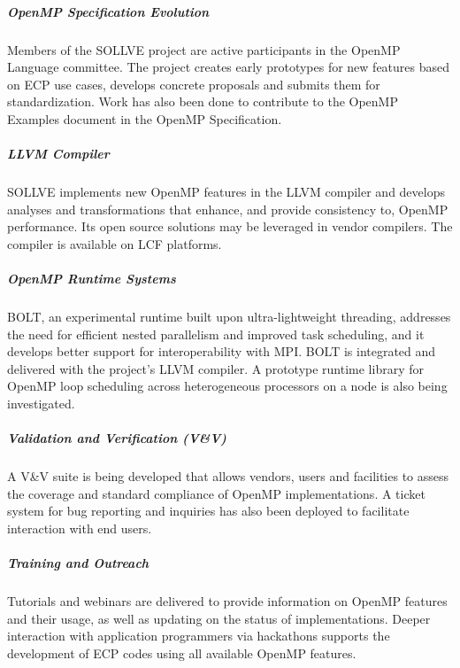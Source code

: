 \subparagraph{OpenMP Specification Evolution}%
Members of the SOLLVE project are active participants in the OpenMP Language committee. The project creates early prototypes for new features based on ECP use cases, develops concrete proposals and submits them for standardization. Work has also been done to contribute to the OpenMP Examples document in the OpenMP Specification. 

\subparagraph{LLVM  Compiler}%
SOLLVE implements new OpenMP features in the LLVM compiler and develops analyses and transformations that enhance, and provide consistency to, OpenMP performance. Its open source solutions may be leveraged in vendor compilers. The compiler is available on LCF platforms.


\subparagraph{OpenMP Runtime Systems}%
BOLT, an experimental runtime built upon ultra-lightweight threading, addresses the need for efficient nested parallelism and improved task scheduling, and it develops better support for interoperability with MPI. BOLT is integrated and delivered with the project's LLVM compiler. A prototype runtime library for OpenMP loop scheduling across heterogeneous processors on a node is also being investigated. 

\subparagraph{Validation and Verification (V\&V)}%
A V\&V suite is being developed that allows vendors, users and facilities to assess the coverage and standard compliance of OpenMP implementations. A ticket system for bug reporting and inquiries has also been deployed to facilitate interaction with end users.
\subparagraph{Training and Outreach}%
 Tutorials and webinars are delivered to provide information on OpenMP features and their usage, as well as updating on the status of 
 implementations. Deeper interaction with application programmers via hackathons supports the development of ECP codes using all available OpenMP features.
%

